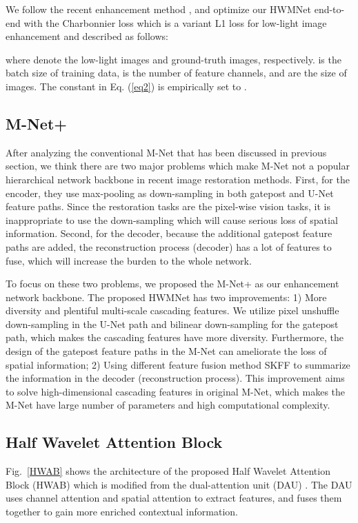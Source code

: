 \documentclass{article}
\begin{document}
We follow the recent enhancement method \cite{01}, and optimize our HWMNet end-to-end with the Charbonnier loss which is a variant L1 loss for low-light image enhancement and described as follows: 

\newcommand{\Lagr}{\mathcal{L}} 

where  denote the low-light images and ground-truth images, respectively.  is the batch size of training data,  is the number of feature channels,  and  are the size of images. The constant  in Eq. (\ref{eq2}) is empirically set to .



\subsection{M-Net+}
After analyzing the conventional M-Net \cite{mnet, fpd} that has been discussed in previous section, we think there are two major problems which make M-Net not a popular hierarchical network backbone in recent image restoration methods. First, for the encoder, they use max-pooling as down-sampling in both gatepost and U-Net feature paths. Since the restoration tasks are the pixel-wise vision tasks, it is inappropriate to use the down-sampling which will cause serious loss of spatial information. Second, for the decoder, because the additional gatepost feature paths are added, the reconstruction process (decoder) has a lot of features to fuse, which will increase the burden to the whole network. 

To focus on these two problems, we proposed the M-Net+ as our enhancement network backbone. The proposed HWMNet has two improvements: 1) More diversity and plentiful multi-scale cascading features. We utilize pixel unshuffle down-sampling in the U-Net path and bilinear down-sampling for the gatepost path, which makes the cascading features have more diversity. Furthermore, the design of the gatepost feature paths in the M-Net can ameliorate the loss of spatial information; 2) Using different feature fusion method SKFF \cite{01} to summarize the information in the decoder (reconstruction process). This improvement aims to solve high-dimensional cascading features in original M-Net, which makes the M-Net have large number of parameters and high computational complexity. 

\subsection{Half Wavelet Attention Block}
Fig.~\ref{HWAB} shows the architecture of the proposed Half Wavelet Attention Block (HWAB) which is modified from the dual-attention unit (DAU) \cite{01, cycleisp}. The DAU uses channel attention \cite{SENet} and spatial attention to extract features, and fuses them together to gain more enriched contextual information.
\end{document}
